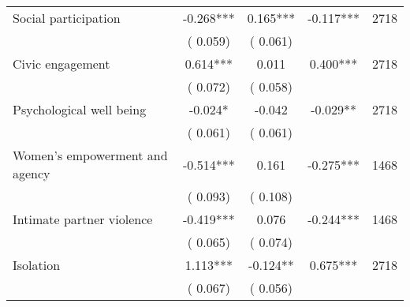 \begin{tabular}{l*{4}{c}}
 Social participation &             -0.268*** &         0.165*** &          -0.117*** & 2718                       \\  
                 &        (       0.059)                   &        (       0.061)                        &                                                             &                                                      \\      

 Civic engagement &              0.614*** &         0.011 &           0.400*** & 2718                       \\  
                 &        (       0.072)                   &        (       0.058)                        &                                                             &                                                      \\      

 Psychological well being &             -0.024* &        -0.042 &          -0.029** & 2718                       \\  
                 &        (       0.061)                   &        (       0.061)                        &                                                             &                                                      \\      

 Women's empowerment and agency &             -0.514*** &         0.161 &          -0.275*** & 1468                       \\  
                 &        (       0.093)                   &        (       0.108)                        &                                                             &                                                      \\      

 Intimate partner violence &             -0.419*** &         0.076 &          -0.244*** & 1468                       \\  
                 &        (       0.065)                   &        (       0.074)                        &                                                             &                                                      \\      

 Isolation &              1.113*** &        -0.124** &           0.675*** & 2718                       \\  
                 &        (       0.067)                   &        (       0.056)                        &                                                             &                                                      \\      


\end{tabular}
